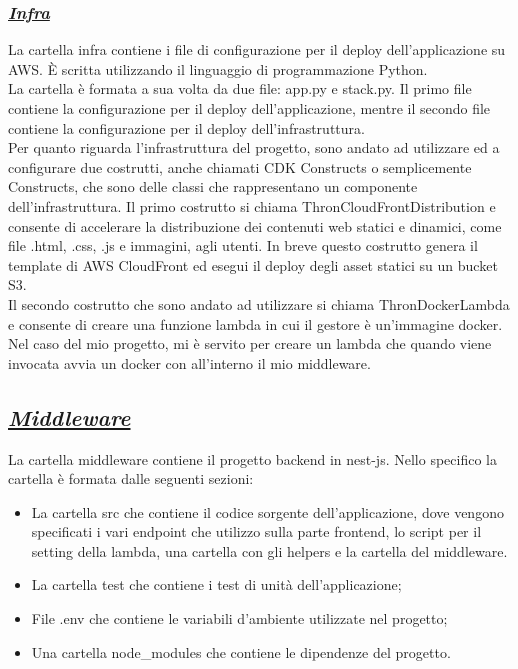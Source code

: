 \subsubsection*{\normalsize\textit{\uline{Infra}}}
La cartella infra contiene i file di configurazione per il deploy dell'applicazione su AWS. È scritta utilizzando il linguaggio di programmazione Python.\\
La cartella è formata a sua volta da due file: app.py e stack.py. Il primo file contiene la configurazione per il deploy dell'applicazione, mentre il secondo file contiene la configurazione per il deploy dell'infrastruttura.\\
Per quanto riguarda l'infrastruttura del progetto, sono andato ad utilizzare ed a configurare due costrutti, anche chiamati CDK Constructs o semplicemente Constructs, che sono delle classi che rappresentano un componente dell'infrastruttura.
Il primo costrutto si chiama ThronCloudFrontDistribution e consente di accelerare la distribuzione dei contenuti web statici e dinamici, come file .html, .css, .js e immagini, agli utenti.
In breve questo costrutto genera il template di AWS CloudFront ed esegui il deploy degli asset statici su un bucket S3.\\
Il secondo costrutto che sono andato ad utilizzare si chiama ThronDockerLambda e consente di creare una funzione lambda in cui il gestore è un'immagine docker.
Nel caso del mio progetto, mi è servito per creare un lambda che quando viene invocata avvia un docker con all'interno il mio middleware.\\

\subsection*{\normalsize\textit{\uline{Middleware}}}
La cartella middleware contiene il progetto backend in nest-js. Nello specifico la cartella è formata dalle seguenti sezioni:
\begin{itemize}
  \item La cartella src che contiene il codice sorgente dell'applicazione, dove vengono specificati i vari endpoint che utilizzo sulla parte frontend, lo script per il setting
  della lambda, una cartella con gli helpers e la cartella del middleware.
  \item La cartella test che contiene i test di unità dell'applicazione;
  \item File .env che contiene le variabili d'ambiente utilizzate nel progetto;
  \item Una cartella node\_modules che contiene le dipendenze del progetto.
\end{itemize}
